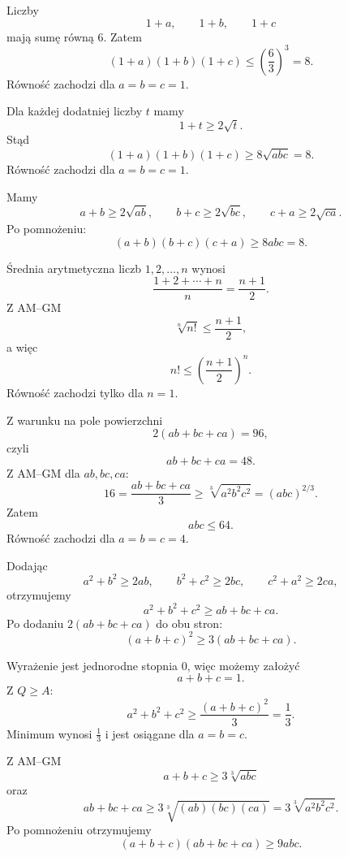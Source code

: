\documentclass{lecture-kuznia}
\begin{document}
\begin{solution*}[\ref{Z2}]
	Liczby
	\[
		1+a,\qquad1+b,\qquad1+c
	\]
	mają sumę równą $6$. Zatem
	\[
		(1+a)(1+b)(1+c)
		\le
		\left(\frac63\right)^3=8.
	\]
	Równość zachodzi dla $a=b=c=1$.
\end{solution*}

\begin{solution*}[\ref{Z3}]
	Dla każdej dodatniej liczby $t$ mamy
	\[
		1+t\ge2\sqrt t.
	\]
	Stąd
	\[
		(1+a)(1+b)(1+c)
		\ge
		8\sqrt{abc}=8.
	\]
	Równość zachodzi dla $a=b=c=1$.
\end{solution*}

\begin{solution*}[\ref{Z4}]
	Mamy
	\[
		a+b\ge2\sqrt{ab},\qquad
		b+c\ge2\sqrt{bc},\qquad
		c+a\ge2\sqrt{ca}.
	\]
	Po pomnożeniu:
	\[
		(a+b)(b+c)(c+a)\ge8abc=8.
	\]
\end{solution*}

\begin{solution*}[\ref{Z5}]
	Średnia arytmetyczna liczb $1,2,\dots,n$ wynosi
	\[
		\frac{1+2+\cdots+n}{n}=\frac{n+1}{2}.
	\]
	Z AM--GM
	\[
		\sqrt[n]{n!}\le\frac{n+1}{2},
	\]
	a więc
	\[
		n!\le\left(\frac{n+1}{2}\right)^n.
	\]
	Równość zachodzi tylko dla $n=1$.
\end{solution*}

\begin{solution*}[\ref{Z6}]
	Z warunku na pole powierzchni
	\[
		2(ab+bc+ca)=96,
	\]
	czyli
	\[
		ab+bc+ca=48.
	\]
	Z AM--GM dla $ab,bc,ca$:
	\[
		16=\frac{ab+bc+ca}{3}
		\ge
		\sqrt[3]{a^2b^2c^2}
		=(abc)^{2/3}.
	\]
	Zatem
	\[
		abc\le64.
	\]
	Równość zachodzi dla $a=b=c=4$.
\end{solution*}

\begin{solution*}[\ref{Z7}]
	Dodając
	\[
		a^2+b^2\ge2ab,\qquad
		b^2+c^2\ge2bc,\qquad
		c^2+a^2\ge2ca,
	\]
	otrzymujemy
	\[
		a^2+b^2+c^2\ge ab+bc+ca.
	\]
	Po dodaniu $2(ab+bc+ca)$ do obu stron:
	\[
		(a+b+c)^2\ge3(ab+bc+ca).
	\]
\end{solution*}

\begin{solution*}[\ref{Z8}]
	Wyrażenie jest jednorodne stopnia $0$, więc możemy założyć
	\[
		a+b+c=1.
	\]
	Z $Q\ge A$:
	\[
		a^2+b^2+c^2
		\ge
		\frac{(a+b+c)^2}{3}
		=
		\frac13.
	\]
	Minimum wynosi $\frac13$ i jest osiągane dla $a=b=c$.
\end{solution*}

\begin{solution*}[\ref{Z9}]
	Z AM--GM
	\[
		a+b+c\ge3\sqrt[3]{abc}
	\]
	oraz
	\[
		ab+bc+ca
		\ge
		3\sqrt[3]{(ab)(bc)(ca)}
		=
		3\sqrt[3]{a^2b^2c^2}.
	\]
	Po pomnożeniu otrzymujemy
	\[
		(a+b+c)(ab+bc+ca)\ge9abc.
	\]
\end{solution*}
\end{document}

